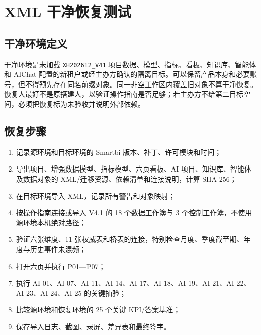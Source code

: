 \documentclass[UTF8,fontset=windows,12pt,openany]{ctexbook}
\newcommand{\Field}[1]{{\small\nolinkurl{#1}}}
\begin{document}
\chapter{XML 干净恢复测试}

\section{干净环境定义}

干净环境是未加载 \Field{XH202612_V41} 项目数据、模型、指标、看板、知识库、智能体和 AIChat 配置的新租户或经主办方确认的隔离目标。可以保留产品本身和必要账号，但不得预先存在同名前缀对象。同一非空工作区内覆盖旧对象不算干净恢复。恢复人最好不是原搭建人，以验证操作指南是否足够；若主办方不给第二目标空间，必须把恢复标为未验收并说明外部依赖。

\section{恢复步骤}

\begin{enumerate}
  \item 记录源环境和目标环境的 Smartbi 版本、补丁、许可模块和时间；
  \item 导出项目、增强数据模型、指标模型、六页看板、AI 项目、知识库、智能体及数据对象的 XML/迁移资源、依赖清单和连接说明，计算 SHA-256；
  \item 在目标环境导入 XML，记录所有警告和对象映射；
  \item 按操作指南连接或导入 V4.1 的 18 个数据工作簿与 3 个控制工作簿，不使用源环境本机绝对路径；
  \item 验证六张维度、11 张权威表和桥表的连接，特别检查月度、季度截至期、年度与历史事件未混频；
  \item 打开六页并执行 P01—P07；
  \item 执行 AI-01、AI-07、AI-11、AI-14、AI-17、AI-18、AI-19、AI-21、AI-22、AI-23、AI-24、AI-25 的关键抽验；
  \item 比较源环境和恢复环境的 25 个关键 KPI/答案基准；
  \item 保存导入日志、截图、录屏、差异表和最终签字。
\end{enumerate}
\end{document}
